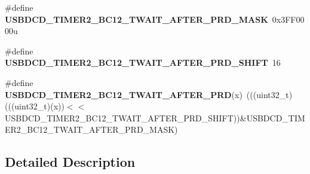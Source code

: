 \begin{DoxyCompactItemize}
\item 
\#define {\bfseries U\+S\+B\+D\+C\+D\+\_\+\+T\+I\+M\+E\+R2\+\_\+\+B\+C12\+\_\+\+T\+W\+A\+I\+T\+\_\+\+A\+F\+T\+E\+R\+\_\+\+P\+R\+D\+\_\+\+M\+A\+SK}~0x3\+F\+F0000u\hypertarget{group__USBDCD__Register__Masks_ga57bc382e906fb13b85747acdef99e068}{}\label{group__USBDCD__Register__Masks_ga57bc382e906fb13b85747acdef99e068}

\item 
\#define {\bfseries U\+S\+B\+D\+C\+D\+\_\+\+T\+I\+M\+E\+R2\+\_\+\+B\+C12\+\_\+\+T\+W\+A\+I\+T\+\_\+\+A\+F\+T\+E\+R\+\_\+\+P\+R\+D\+\_\+\+S\+H\+I\+FT}~16\hypertarget{group__USBDCD__Register__Masks_ga74ba24e1b99aacbe03cfab94267a2d5c}{}\label{group__USBDCD__Register__Masks_ga74ba24e1b99aacbe03cfab94267a2d5c}

\item 
\#define {\bfseries U\+S\+B\+D\+C\+D\+\_\+\+T\+I\+M\+E\+R2\+\_\+\+B\+C12\+\_\+\+T\+W\+A\+I\+T\+\_\+\+A\+F\+T\+E\+R\+\_\+\+P\+RD}(x)~(((uint32\+\_\+t)(((uint32\+\_\+t)(x))$<$$<$U\+S\+B\+D\+C\+D\+\_\+\+T\+I\+M\+E\+R2\+\_\+\+B\+C12\+\_\+\+T\+W\+A\+I\+T\+\_\+\+A\+F\+T\+E\+R\+\_\+\+P\+R\+D\+\_\+\+S\+H\+I\+FT))\&U\+S\+B\+D\+C\+D\+\_\+\+T\+I\+M\+E\+R2\+\_\+\+B\+C12\+\_\+\+T\+W\+A\+I\+T\+\_\+\+A\+F\+T\+E\+R\+\_\+\+P\+R\+D\+\_\+\+M\+A\+SK)\hypertarget{group__USBDCD__Register__Masks_ga0303615438e18cd52f1e19a84966b670}{}\label{group__USBDCD__Register__Masks_ga0303615438e18cd52f1e19a84966b670}

\end{DoxyCompactItemize}


\subsection{Detailed Description}
